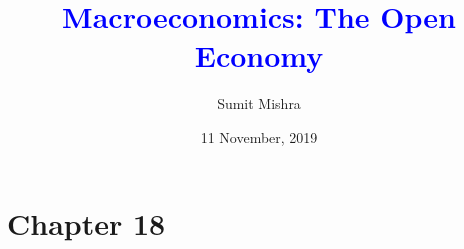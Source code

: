 \documentclass[shownotes,11pt, aspectratio=169]{beamer}
\title[]{\textcolor{blue}{Macroeconomics: The Open Economy}}
\author[SM]{Sumit Mishra}
\institute[IFMR]{\small{\begin{tabular}{c}
IFMR, Sri City \\
\end{tabular}}}
\date{11 November, 2019}
\begin{document}
\begin{frame}
\titlepage %
\end{frame}


\section{Chapter 18}
\begin{frame}
\begin{center}
\centering
\end{center}
\end{frame}
\end{document}
